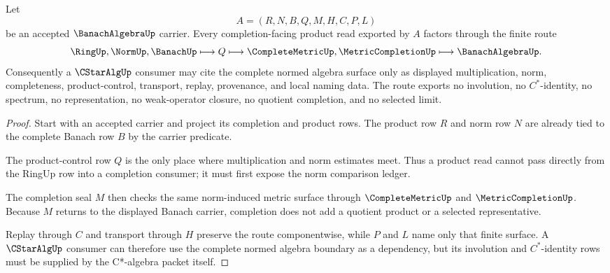 \begin{theorem}
\label{thm:banach-algebra-completion-product-nonescape}
Let
$$
A=(R,N,B,Q,M,H,C,P,L)
$$
be an accepted $\BanachAlgebraUp$ carrier. Every completion-facing product read exported by $A$ factors through the finite route
$$
\RingUp,\NormUp,\BanachUp \longmapsto Q \longmapsto \CompleteMetricUp,\MetricCompletionUp \longmapsto \BanachAlgebraUp .
$$
Consequently a $\CStarAlgUp$ consumer may cite the complete normed algebra surface only as displayed multiplication, norm, completeness, product-control, transport, replay, provenance, and local naming data. The route exports no involution, no $C^*$-identity, no spectrum, no representation, no weak-operator closure, no quotient completion, and no selected limit.
\end{theorem}
\begin{proof}
Start with an accepted carrier and project its completion and product rows. The product row $R$ and norm row $N$ are already tied to the complete Banach row $B$ by the carrier predicate.

The product-control row $Q$ is the only place where multiplication and norm estimates meet. Thus a product read cannot pass directly from the RingUp row into a completion consumer; it must first expose the norm comparison ledger.

The completion seal $M$ then checks the same norm-induced metric surface through $\CompleteMetricUp$ and $\MetricCompletionUp$. Because $M$ returns to the displayed Banach carrier, completion does not add a quotient product or a selected representative.

Replay through $C$ and transport through $H$ preserve the route componentwise, while $P$ and $L$ name only that finite surface. A $\CStarAlgUp$ consumer can therefore use the complete normed algebra boundary as a dependency, but its involution and $C^*$-identity rows must be supplied by the C*-algebra packet itself.
\end{proof}

